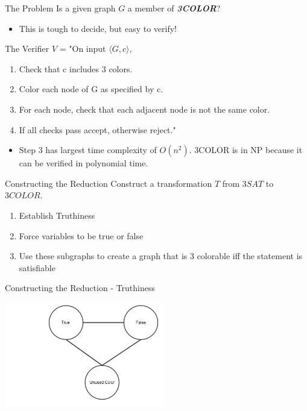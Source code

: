 \documentclass[bigger]{beamer}
\begin{document}
\begin{frame}[label=sec-4]{The Problem}
Is a given graph \(G\) a member of \textbf{\textit{3COLOR}}?

\begin{itemize}
\item<2-> This is tough to decide, but easy to verify!
\end{itemize}
\end{frame}

\begin{frame}[label=sec-5]{The Verifier}
\(V\) = "On input \(\langle G, c \rangle\),
\begin{enumerate}
\item<1-> Check that c includes 3 colors.
\item<2-> Color each node of G as specified by c.
\item<3-> For each node, check that each adjacent node is not the same color.
\item<4-> If all checks pass accept, otherwise reject."
\end{enumerate}

\begin{itemize}
\item<5->Step 3 has largest time complexity of \(O(n^2)\). 3COLOR is in NP because it can be verified in polynomial time.
\end{itemize}
\end{frame}


\begin{frame}[label=sec-6]{Constructing the Reduction}
Construct a transformation \(T\) from \(3SAT\) to \(3COLOR\).
\begin{enumerate}
\item<2-> Establish Truthiness
\item<3-> Force variables to be true or false
\item<4-> Use these subgraphs to create a graph that is 3 colorable iff the statement is satisfiable
\end{enumerate}
\end{frame}

\begin{frame}[label=sec-7]{Constructing the Reduction - Truthiness}
\begin{center}
\includegraphics[width=7cm]{Truthiness.png}
\end{center}
\end{frame}
\end{document}
